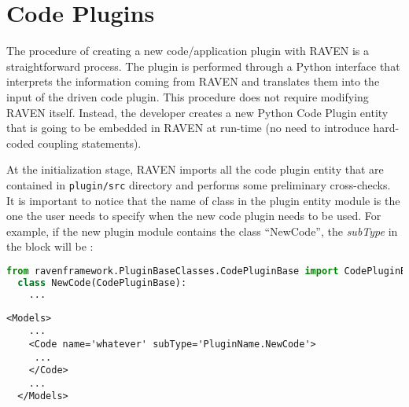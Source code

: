 \section{Code Plugins}
\label{sec:codePlugins}

The procedure of creating a new code/application plugin with RAVEN is a straightforward process.
The plugin is performed through a Python interface that interprets the information coming from RAVEN
and translates them into the input of the driven code plugin. This procedure does not require
modifying RAVEN itself. Instead, the developer creates a new Python Code Plugin entity that is
going to be embedded in RAVEN at run-time (no need to introduce  hard-coded coupling statements).

At the initialization stage, RAVEN imports all the code plugin entity that are contained in
\texttt{plugin/src} directory and performs some preliminary cross-checks.
\\It is important to notice that the name of class in the plugin entity module is the one
the user needs to specify when the new code plugin needs to be used.
For example, if the new plugin module contains the class ``NewCode'',
the \textit{subType} in the  block will be :
\begin{lstlisting}[language=python, basicstyle=\scriptsize\ttfamily, breaklines=True, columns=fullflexible]
  from ravenframework.PluginBaseClasses.CodePluginBase import CodePluginBase
  class NewCode(CodePluginBase):
    ...
\end{lstlisting}
\begin{lstlisting}[style=XML,morekeywords={name,file}] %moreemph={name,file}]
  <Models>
    ...
    <Code name='whatever' subType='PluginName.NewCode'>
     ...
    </Code>
    ...
  </Models>
\end{lstlisting}

